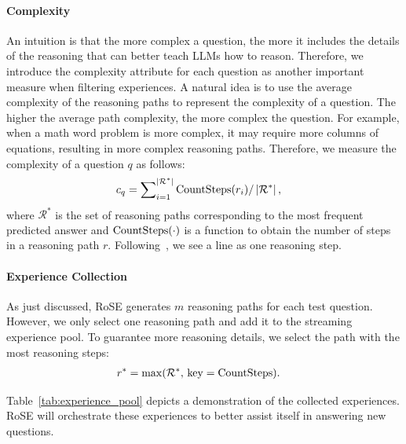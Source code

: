 \documentclass[11pt]{article}
\begin{document}
\paragraph{Complexity} An intuition is that the more complex a question, the more it includes the details of the reasoning that can better teach LLMs how to reason. Therefore, we introduce the complexity attribute for each question as another important measure when filtering experiences. A natural idea is to use the average complexity of the reasoning paths to represent the complexity of a question. The higher the average path complexity, the more complex the question. For example, when a math word problem is more complex, it may require more columns of equations, resulting in more complex reasoning paths. Therefore, we measure the complexity of a question $q$ as follows:
\begin{align}
    & c_{q} = \sum\nolimits_{i=1}^{\left|\mathcal{R}^*\right|}{\rm CountSteps}(r_i)/\left|\mathcal{R}^*\right|,
\end{align}
where $\mathcal{R}^*$ is the set of reasoning paths corresponding to the most frequent predicted answer and $\rm CountSteps(\cdot)$ is a function to obtain the number of steps in a reasoning path $r$. Following~\citet{fu2023complexity}, we see a line as one reasoning step.

\paragraph{Experience Collection}
As just discussed, RoSE generates $m$ reasoning paths for each test question. However, we only select one reasoning path and add it to the streaming experience pool. To guarantee more reasoning details, we select the path with the most reasoning steps:
\begin{align}
    & r^* = \max (\mathcal{R}^*,\, {\rm key}={\rm CountSteps}).
\end{align}

Table~\ref{tab:experience_pool} depicts a demonstration of the collected experiences. RoSE will orchestrate these experiences to better assist itself in answering new questions.

\begin{table}[ht]
\caption{An example of the experiences stored in the experience pool.}
\label{tab:experience_pool}
\end{table}
\end{document}
